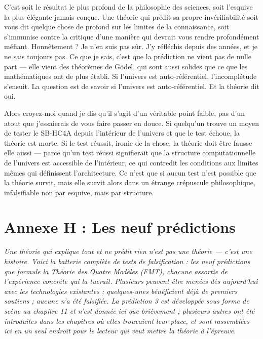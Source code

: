\documentclass[11pt, twoside, openright]{book}
\begin{document}
C'est soit le résultat le plus profond de la philosophie des sciences, soit l'esquive la plus élégante jamais conçue. Une théorie qui prédit sa propre invérifiabilité soit vous dit quelque chose de profond sur les limites de la connaissance, soit s'immunise contre la critique d'une manière qui devrait vous rendre profondément méfiant. Honnêtement ? Je n'en suis pas sûr. J'y réfléchis depuis des années, et je ne sais toujours pas. Ce que je sais, c'est que la prédiction ne vient pas de nulle part --- elle vient des théorèmes de Gödel, qui sont aussi solides que ce que les mathématiques ont de plus établi. Si l'univers est auto-référentiel, l'incomplétude s'ensuit. La question est de savoir si l'univers est auto-référentiel. Et la théorie dit oui.

Alors croyez-moi quand je dis qu'il s'agit d'un véritable point faible, pas d'un atout que j'essaierais de vous faire passer en douce. Si quelqu'un trouve un moyen de tester le SB-HC4A depuis l'intérieur de l'univers et que le test échoue, la théorie est morte. Si le test réussit, ironie de la chose, la théorie doit être fausse elle aussi --- parce qu'un test réussi signifierait que la structure computationnelle de l'univers est accessible de l'intérieur, ce qui contredit les conditions aux limites mêmes qui définissent l'architecture. Ce n'est que si aucun test n'est possible que la théorie survit, mais elle survit alors dans un étrange crépuscule philosophique, infalsifiable non par esquive, mais par structure.


\chapter*{Annexe H : Les neuf prédictions}

\textit{Une théorie qui explique tout et ne prédit rien n'est pas une théorie --- c'est une histoire. Voici la batterie complète de tests de falsification : les neuf prédictions que formule la Théorie des Quatre Modèles (FMT), chacune assortie de l'expérience concrète qui la tuerait. Plusieurs peuvent être menées dès aujourd'hui avec les technologies existantes ; quelques-unes bénéficient déjà de premiers soutiens ; aucune n'a été falsifiée. La prédiction 3 est développée sous forme de scène au chapitre 11 et n'est donnée ici que brièvement ; plusieurs autres ont été introduites dans les chapitres où elles trouvaient leur place, et sont rassemblées ici en un seul endroit pour le lecteur qui veut mettre la théorie à l'épreuve.}
\end{document}
